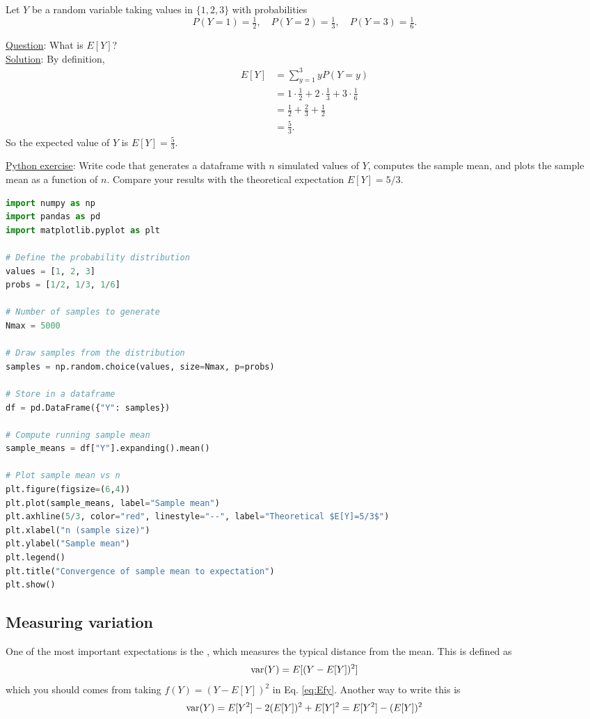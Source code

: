 \begin{example}
Let $Y$ be a random variable taking values in $\{1,2,3\}$ with probabilities
\[
P(Y=1)=\tfrac{1}{2}, \quad P(Y=2)=\tfrac{1}{3}, \quad P(Y=3)=\tfrac{1}{6}.
\]

\noindent
\underline{Question}: What is $E[Y]$?\\

\noindent
\underline{Solution}: By definition,
\begin{align*}
E[Y] &= \sum_{y=1}^3 y P(Y=y) \\
     &= 1\cdot \tfrac{1}{2} + 2\cdot \tfrac{1}{3} + 3\cdot \tfrac{1}{6} \\
     &= \tfrac{1}{2} + \tfrac{2}{3} + \tfrac{1}{2} \\
     &= \tfrac{5}{3}.
\end{align*}
So the expected value of $Y$ is $E[Y] = \tfrac{5}{3}$. 

\noindent
\underline{Python exercise}: Write code that generates a dataframe with $n$ simulated values of $Y$, computes the sample mean, and plots the sample mean as a function of $n$. Compare your results with the theoretical expectation $E[Y]=5/3$. 

\begin{lstlisting}[language=Python]
import numpy as np
import pandas as pd
import matplotlib.pyplot as plt

# Define the probability distribution
values = [1, 2, 3]
probs = [1/2, 1/3, 1/6]

# Number of samples to generate
Nmax = 5000

# Draw samples from the distribution
samples = np.random.choice(values, size=Nmax, p=probs)

# Store in a dataframe
df = pd.DataFrame({"Y": samples})

# Compute running sample mean
sample_means = df["Y"].expanding().mean()

# Plot sample mean vs n
plt.figure(figsize=(6,4))
plt.plot(sample_means, label="Sample mean")
plt.axhline(5/3, color="red", linestyle="--", label="Theoretical $E[Y]=5/3$")
plt.xlabel("n (sample size)")
plt.ylabel("Sample mean")
plt.legend()
plt.title("Convergence of sample mean to expectation")
plt.show()
\end{lstlisting}
\end{example}

\subsection{Measuring variation}
One of the most important expectations is the , which measures the typical distance from the mean. This is defined as
\begin{equation*}
{\rm var}(Y) = E[(Y-E[Y])^2]
\end{equation*}
which you should comes from taking $f(Y) = (Y-E[Y])^2$ in Eq. \ref{eq:Efy}. 
Another way to write this is 
\begin{equation*}
 {\rm var}(Y) = E[Y^2] - 2(E[Y])^2 + E[Y]^2 = E[Y^2]-(E[Y])^2
\end{equation*}

